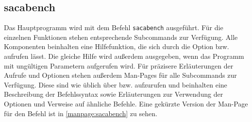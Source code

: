 \subsection{sacabench}
\label{framework:cli:sacabench}

Das Hauptprogramm wird mit dem Befehl \texttt{sacabench} ausgeführt.
Für die einzelnen Funktionen stehen ent\-sprech\-ende Subcommands zur Verfügung.
Alle Komponenten beinhalten eine Hilfefunktion, die sich durch die Option  bzw.  aufrufen lässt.
Die gleiche Hilfe wird außerdem ausgegeben, wenn das Programm mit ungültigen Parametern aufgerufen wird.
Für präzisere Erläuterungen der Aufrufe und Optionen stehen außerdem Man-Pages für alle Subcommands zur Verfügung.
Diese sind wie üblich über  bzw.  aufzurufen  und beinhalten eine Beschreibung der Befehlssyntax sowie Erläuterungen zur Verwendung der Optionen und Verweise auf ähnliche Befehle.
Eine gekürzte Version der Man-Page für den Befehl  ist in \cref{manpage:sacabench} zu sehen.
